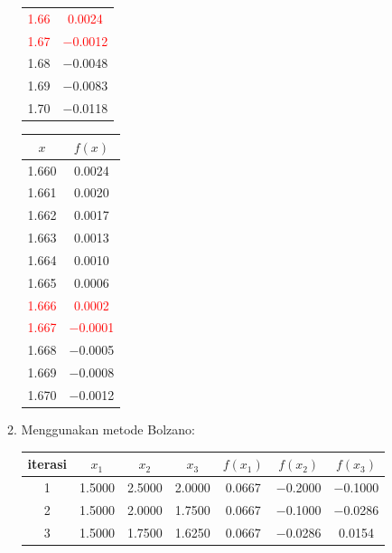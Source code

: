 \documentclass{article}
\begin{document}
\begin{enumerate}
\begin{enumerate}
\begin{tabular}{|c|c|}
            \textcolor{red}{\num{1,66}} & \textcolor{red}{\num{0,0024}} \\
            \textcolor{red}{\num{1,67}} & \textcolor{red}{\num{-0,0012}} \\
            \num{1,68} & \num{-0,0048} \\
            \num{1,69} & \num{-0,0083} \\
            \num{1,70} & \num{-0,0118} \\
            \hline
            \end{tabular}\quad
            \begin{tabular}{|c|c|}
            \hline
            $x$   & $f(x)$ \\
            \hline
            \num{1,660} & \num{0,0024} \\
            \num{1,661} & \num{0,0020} \\
            \num{1,662} & \num{0,0017} \\
            \num{1,663} & \num{0,0013} \\
            \num{1,664} & \num{0,0010} \\
            \num{1,665} & \num{0,0006} \\
            \textcolor{red}{\num{1,666}} & \textcolor{red}{\num{0,0002}} \\
            \textcolor{red}{\num{1,667}} & \textcolor{red}{\num{-0,0001}} \\
            \num{1,668} & \num{-0,0005} \\
            \num{1,669} & \num{-0,0008} \\
            \num{1,670} & \num{-0,0012} \\
            \hline
            \end{tabular}\quad

        \item Menggunakan metode Bolzano: \\
        \begin{tabular}{|c|c|c|c|c|c|c|}
            \hline
            iterasi & $x_1$ & $x_2$ & $x_3$ & $f(x_1)$ & $f(x_2)$ & $f(x_3)$ \\
            \hline
            1 & \num{1,5000} & \num{2,5000} & \num{2,0000} & \num{0,0667} & \num{-0,2000} & \num{-0,1000}\\
            2 & \num{1,5000} & \num{2,0000} & \num{1,7500} & \num{0,0667} & \num{-0,1000} & \num{-0,0286}\\
            3 & \num{1,5000} & \num{1,7500} & \num{1,6250} & \num{0,0667} & \num{-0,0286} & \num{0,0154}\\
             \hline
            \end{tabular}   
            

\end{enumerate}
\end{enumerate}
\end{document}
